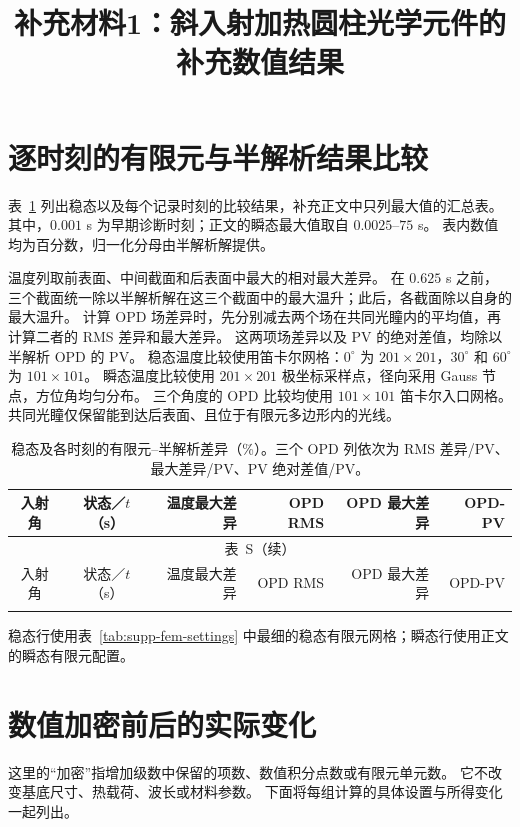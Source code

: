 \documentclass[9pt]{osa-supplemental-document}
\title{补充材料1：斜入射加热圆柱光学元件的补充数值结果}
\author{} %
\date{}
\renewcommand{\thetable}{S\arabic{table}}
\begin{document}
\maketitle

\section{逐时刻的有限元与半解析结果比较}
表~\ref{tab:supp-comparison} 列出稳态以及每个记录时刻的比较结果，补充正文中只列最大值的汇总表。
其中，$0.001$ s 为早期诊断时刻；正文的瞬态最大值取自 $0.0025$--$75$ s。
表内数值均为百分数，归一化分母由半解析解提供。

温度列取前表面、中间截面和后表面中最大的相对最大差异。
在 $0.625$ s 之前，三个截面统一除以半解析解在这三个截面中的最大温升；此后，各截面除以自身的最大温升。
计算 OPD 场差异时，先分别减去两个场在共同光瞳内的平均值，再计算二者的 RMS 差异和最大差异。
这两项场差异以及 PV 的绝对差值，均除以半解析 OPD 的 PV。
稳态温度比较使用笛卡尔网格：$0^\circ$ 为 $201\times201$，$30^\circ$ 和 $60^\circ$ 为 $101\times101$。
瞬态温度比较使用 $201\times201$ 极坐标采样点，径向采用 Gauss 节点，方位角均匀分布。
三个角度的 OPD 比较均使用 $101\times101$ 笛卡尔入口网格。
共同光瞳仅保留能到达后表面、且位于有限元多边形内的光线。

\begingroup\small
\begin{longtable}{ccrrrr}
\caption{稳态及各时刻的有限元--半解析差异（\%）。三个 OPD 列依次为 RMS 差异/PV、最大差异/PV、PV 绝对差值/PV。}\label{tab:supp-comparison}\\
\toprule
入射角 & 状态／$t$（s） & 温度最大差异 & OPD RMS & OPD 最大差异 & OPD-PV\\\midrule
\endfirsthead
\multicolumn{6}{c}{表~\thetable（续）}\\\toprule
入射角 & 状态／$t$（s） & 温度最大差异 & OPD RMS & OPD 最大差异 & OPD-PV\\\midrule
\endhead
\bottomrule\endfoot

\end{longtable}
\endgroup
稳态行使用表~\ref{tab:supp-fem-settings} 中最细的稳态有限元网格；瞬态行使用正文的瞬态有限元配置。

\section{数值加密前后的实际变化}
这里的“加密”指增加级数中保留的项数、数值积分点数或有限元单元数。
它不改变基底尺寸、热载荷、波长或材料参数。
下面将每组计算的具体设置与所得变化一起列出。
\end{document}
